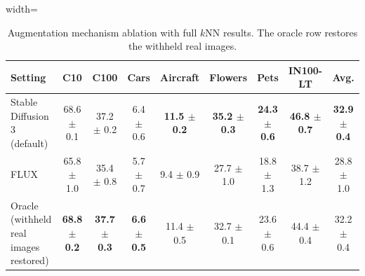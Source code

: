 \begin{table}[H]
\centering
\scriptsize
\setlength{\tabcolsep}{3.5pt}
\caption{Augmentation mechanism ablation with full $k$NN results. The oracle row restores the withheld real images.}
\label{tab:app_generation_knn}
\begin{adjustbox}{width=\textwidth}
\begin{tabular}{l c c c c c c c c}
\toprule
Setting & C10 & C100 & Cars & Aircraft & Flowers & Pets & IN100-LT & Avg. \\
\midrule
Stable Diffusion 3 (default) & 68.6 {\scriptsize$\pm$ 0.1} & 37.2 {\scriptsize$\pm$ 0.2} & 6.4 {\scriptsize$\pm$ 0.6} & \textbf{11.5 {\scriptsize$\pm$ 0.2}} & \textbf{35.2 {\scriptsize$\pm$ 0.3}} & \textbf{24.3 {\scriptsize$\pm$ 0.6}} & \textbf{46.8 {\scriptsize$\pm$ 0.7}} & \textbf{32.9 {\scriptsize$\pm$ 0.4}} \\
FLUX & 65.8 {\scriptsize$\pm$ 1.0} & 35.4 {\scriptsize$\pm$ 0.8} & 5.7 {\scriptsize$\pm$ 0.7} & 9.4 {\scriptsize$\pm$ 0.9} & 27.7 {\scriptsize$\pm$ 1.0} & 18.8 {\scriptsize$\pm$ 1.3} & 38.7 {\scriptsize$\pm$ 1.2} & 28.8 {\scriptsize$\pm$ 1.0} \\
Oracle (withheld real images restored) & \textbf{68.8 {\scriptsize$\pm$ 0.2}} & \textbf{37.7 {\scriptsize$\pm$ 0.3}} & \textbf{6.6 {\scriptsize$\pm$ 0.5}} & 11.4 {\scriptsize$\pm$ 0.5} & 32.7 {\scriptsize$\pm$ 0.1} & 23.6 {\scriptsize$\pm$ 0.6} & 44.4 {\scriptsize$\pm$ 0.4} & 32.2 {\scriptsize$\pm$ 0.4} \\
\bottomrule
\end{tabular}
\end{adjustbox}
\end{table}
